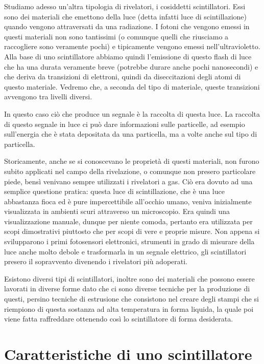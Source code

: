 Studiamo adesso un'altra tipologia di rivelatori, i cosiddetti scintillatori. Essi sono dei materiali che emettono della luce (detta infatti luce di scintillazione) quando vengono attraversati da una radiazione. I fotoni che vengono emessi in questi materiali non sono tantissimi (o comunque quelli che riusciamo a raccogliere sono veramente pochi) e tipicamente vengono emessi nell'ultravioletto. Alla base di uno scintillatore abbiamo quindi l'emissione di questo flash di luce che ha una durata veramente breve (potrebbe durare anche pochi nanosecondi) e che deriva da transizioni di elettroni, quindi da diseccitazioni degli atomi di questo materiale. Vedremo che, a seconda del tipo di materiale, queste transizioni avvengono tra livelli diversi.

In questo caso ciò che produce un segnale è la raccolta di questa luce. La raccolta di questo segnale in luce ci può dare informazioni sulle particelle, ad esempio sull'energia che è stata depositata da una particella, ma a volte anche sul tipo di particella.

Storicamente, anche se si conoscevano le proprietà di questi materiali, non furono subito applicati nel campo della rivelazione, o comunque non presero particolare piede, bensì venivano sempre utilizzati i rivelatori a gas. Ciò era dovuto ad una semplice questione pratica: questa luce di scintillazione, che è una luce abbastanza fioca ed è pure impercettibile all'occhio umano, veniva inizialmente visualizzata in ambienti scuri attraverso un microscopio. Era quindi una visualizzazione manuale, dunque per niente comoda, pertanto era utilizzata per scopi dimostrativi piuttosto che per scopi di vere e proprie misure. Non appena si svilupparono i primi fotosensori elettronici, strumenti in grado di misurare della luce anche molto debole e trasformarla in un segnale elettrico, gli scintillatori presero il sopravvento divenendo i rivelatori più adoperati.

Esistono diversi tipi di scintillatori, inoltre sono dei materiali che possono essere lavorati in diverse forme dato che ci sono diverse tecniche per la produzione di questi, persino tecniche di estrusione che consistono nel creare degli stampi che si riempiono di questa sostanza ad alta temperatura in forma liquida, la quale poi viene fatta raffreddare ottenendo così lo scintillatore di forma desiderata.

\section{Caratteristiche di uno scintillatore}

